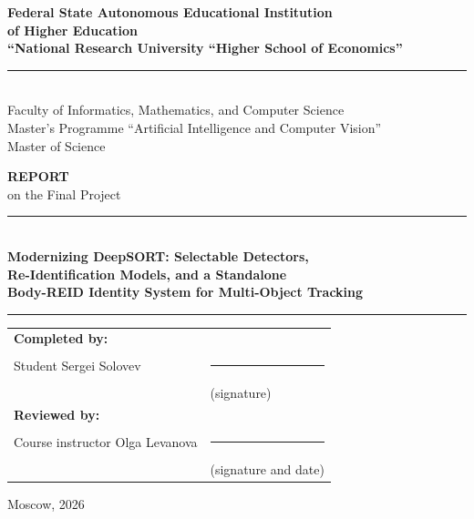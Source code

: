 \documentclass[12pt, a4paper]{article}
\begin{document}
\begin{titlepage}
\begin{center}

\textbf{Federal State Autonomous Educational Institution \\
of Higher Education} \\[4pt]
\textbf{``National Research University ``Higher School of Economics''} \\[24pt]

\rule{\textwidth}{0.4pt} \\[12pt]

{\large Faculty of Informatics, Mathematics, and Computer Science} \\[6pt]
{\large Master's Programme ``Artificial Intelligence and Computer Vision''} \\[6pt]
{\large Master of Science} \\[24pt]

\vspace{1cm}

{\LARGE \bfseries REPORT} \\[6pt]
{\large on the Final Project} \\[18pt]

\rule{0.8\textwidth}{0.4pt} \\[12pt]

{\Large \bfseries
Modernizing DeepSORT: Selectable Detectors, \\
Re-Identification Models, and a Standalone \\
Body-REID Identity System for Multi-Object Tracking
} \\[24pt]

\rule{0.8\textwidth}{0.4pt}

\vfill

\begin{flushleft}
\begin{tabular}{p{} p{}}
\textbf{Completed by:} & \\
Student Sergei Solovev & \rule{4cm}{0.4pt} \\
 & {\small (signature)} \\[18pt]
\textbf{Reviewed by:} & \\
Course instructor Olga Levanova & \rule{4cm}{0.4pt} \\
 & {\small (signature and date)} \\
\end{tabular}
\end{flushleft}

\vspace{1cm}
{\large Moscow, 2026}

\end{center}
\end{titlepage}
\end{document}
